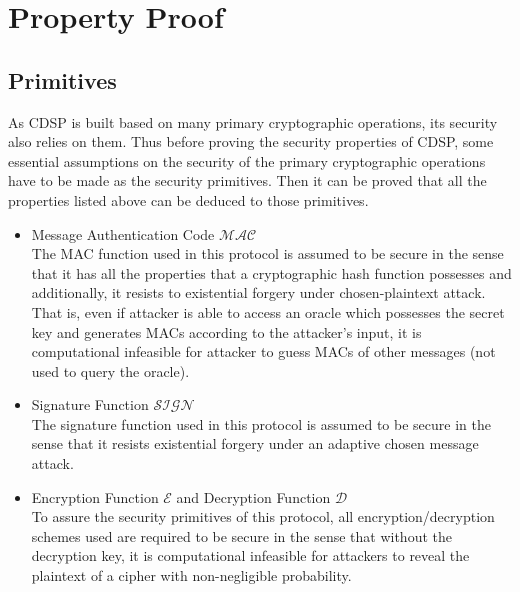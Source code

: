 \section{Property Proof}
\subsection{Primitives}
As CDSP is built based on many primary cryptographic operations, its security also relies on them. Thus before proving the security properties of CDSP, some essential assumptions on the security of the primary cryptographic operations have to be made as the security primitives. Then it can be proved that all the properties listed above can be deduced to those primitives.
\begin{itemize}
\item Message Authentication Code $\mathcal{MAC}$\\
The MAC \cite{RFC2104} function used in this protocol is assumed to be secure in the sense that it has all the properties that a cryptographic hash function possesses and additionally, it resists to existential forgery under chosen-plaintext attack. That is, even if attacker is able to access an oracle which possesses the secret key and generates MACs according to the attacker's input, it is computational infeasible for attacker to guess MACs of other messages (not used to query the oracle).

\item Signature Function $\mathcal{SIGN}$\\
The signature function used in this protocol is assumed to be secure in the sense that it resists existential forgery under an adaptive chosen message attack. \cite{Goldwasser}\cite{Mao}

\item Encryption Function $\mathcal{E}$ and Decryption Function $\mathcal{D}$\\
To assure the security primitives of this protocol, all encryption/decryption schemes used are required to be secure in the sense that without the decryption key, it is computational infeasible for attackers to reveal the plaintext of a cipher with non-negligible probability.


\end{itemize}
